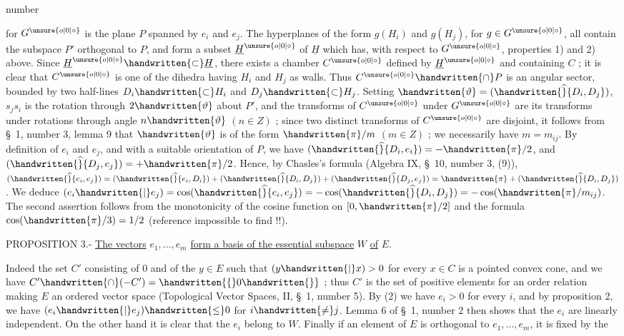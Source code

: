 \begin{flushright}number \end{flushright}
for $G^{\unsure{o|0|\circ}}$ is the plane $P$ spanned by $e_i$ and $e_j$. The hyperplanes of the form $g(H_i)$ and $g(H_j)$, for $g\in G^{\unsure{o|0|\circ}}$, all contain the subspace $P'$ orthogonal to $P$, and form a subset $\underline{H}^{\unsure{o|0|\circ}}$ of $\underline{H}$ which has, with respect to $G^{\unsure{o|0|\circ}}$, properties 1) and 2) above. Since $\underline{H}^{\unsure{o|0|\circ}}\handwritten{\subset}\underline{H}$, there exists a chamber $C^{\unsure{o|0|\circ}}$ defined by $\underline{H}^{\unsure{o|0|\circ}}$ and containing $C$ ; it is clear that $C^{\unsure{o|0|\circ}}$ is one of the dihedra having $H_i$ and $H_j$ as walls. Thus $C^{\unsure{o|0|\circ}}\handwritten{\cap}P$ is an angular sector, bounded by two half-lines $D_i\handwritten{\subset}H_i$ and $D_j\handwritten{\subset}H_j$. Setting $\handwritten{\vartheta}=(\handwritten{\widehat}{D_i,D_j})$, $s_j s_i$ is the rotation through $2\handwritten{\vartheta}$ about $P'$, and the transforms of $C^{\unsure{o|0|\circ}}$ under $G^{\unsure{o|0|\circ}}$ are its transforms under rotations through angle $n\handwritten{\vartheta}$ $(n\in Z)$ ; since two distinct transforms of $C^{\unsure{o|0|\circ}}$ are disjoint, it follows from \S\ 1, number 3, lemma 9 that $\handwritten{\vartheta}$ is of the form $\handwritten{\pi}/m$ $(m\in Z)$ ; we necessarily have $m=m_{ij}$. By definition of $e_i$ and $e_j$, and with a suitable orientation of $P$, we have $(\handwritten{\widehat}{D_i,e_i})=-\handwritten{\pi}/2$, and $(\handwritten{\widehat}{D_j,e_j})=+\handwritten{\pi}/2$. Hence, by Chasles's formula (Algebra IX, \S\ 10, number 3, (9)), $(\handwritten{\widehat}{e_i,e_j})=(\handwritten{\widehat}{e_i,D_i})+(\handwritten{\widehat}{D_i,D_j})+(\handwritten{\widehat}{D_j,e_j})=\handwritten{\pi}+(\handwritten{\widehat}{D_i,D_j})$. We deduce $(e_i\handwritten{|}e_j)=\cos(\handwritten{\widehat}{e_i,e_j})=-\cos(\handwritten{\widehat}{D_i,D_j})=-\cos(\handwritten{\pi}/m_{ij})$. The second assertion follows from the monotonicity of the cosine function on $[0,\handwritten{\pi}/2]$ and the formula $\cos(\handwritten{\pi}/3)=1/2$ (reference impossible to find !!).

PROPOSITION 3.- \uline{The vectors} $e_1,\ldots,e_m$ \uline{form a basis of the essential subspace} $W$ \uline{of} $E$.

Indeed the set $C'$ consisting of $0$ and of the $y\in E$ such that $(y\handwritten{|}x)>0$ for every $x\in C$ is a pointed convex cone, and we have $C'\handwritten{\cap}(-C')=\handwritten{\{}0\handwritten{\}}$ ; thus $C'$ is the set of positive elements for an order relation making $E$ an ordered vector space (Topological Vector Spaces, II, \S\ 1, number 5). By (2) we have $e_i>0$ for every $i$, and by proposition 2, we have $(e_i\handwritten{|}e_j)\handwritten{\leq}0$ for $i\handwritten{\ne}j$. Lemma 6 of \S\ 1, number 2 then shows that the $e_i$ are linearly independent. On the other hand it is clear that the $e_i$ belong to $W$. Finally if an element of $E$ is orthogonal to $e_1,\ldots,e_m$, it is fixed by the
